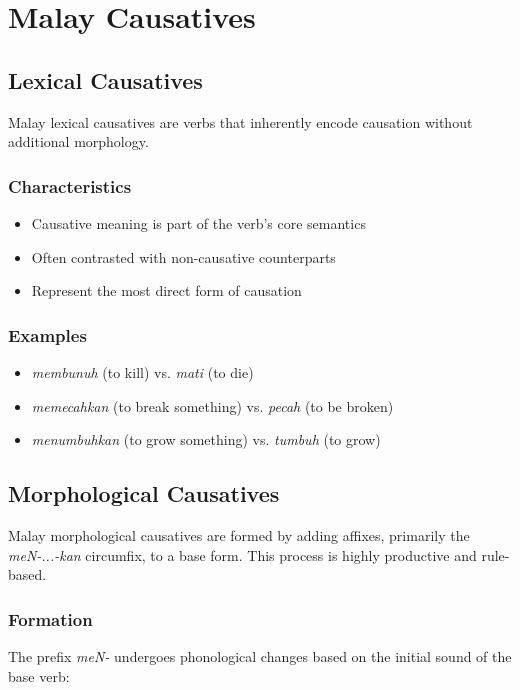 \documentclass[12pt,a4paper]{article}
\begin{document}
\section{Malay Causatives}

\subsection{Lexical Causatives}

Malay lexical causatives are verbs that inherently encode causation without additional morphology. 

\subsubsection{Characteristics}
\begin{itemize}
\item Causative meaning is part of the verb's core semantics
\item Often contrasted with non-causative counterparts
\item Represent the most direct form of causation
\end{itemize}

\subsubsection{Examples}
\begin{itemize}
\item \textit{membunuh} (to kill) vs. \textit{mati} (to die)
\item \textit{memecahkan} (to break something) vs. \textit{pecah} (to be broken)
\item \textit{menumbuhkan} (to grow something) vs. \textit{tumbuh} (to grow)
\end{itemize}

\subsection{Morphological Causatives}

Malay morphological causatives are formed by adding affixes, primarily the \textit{meN-...-kan} circumfix, to a base form. This process is highly productive and rule-based.

\subsubsection{Formation}
The prefix \textit{meN-} undergoes phonological changes based on the initial sound of the base verb:
\end{document}
